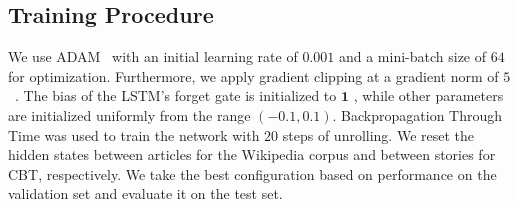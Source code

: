 \documentclass{article}
\newcommand{\vect}[1]{\ensuremath{\bm{#1}}}
\begin{document}
\subsection{Training Procedure}
We use ADAM~\citep{kingma2014adam} with an initial learning rate of $0.001$ and a mini-batch size of $64$ for optimization. 
Furthermore, we apply gradient clipping at a gradient norm of $5$~\citep{pascanu2013difficulty}.
The bias of the LSTM's forget gate is initialized to $\vect{1}$ \citep{JOZ16}, while other parameters are initialized uniformly from the range $(-0.1, 0.1)$.
Backpropagation Through Time \citep{rumelhart1985learning, werbos1990backpropagation} was used to train the network with $20$ steps of unrolling.
We reset the hidden states between articles for the Wikipedia corpus and between stories for CBT, respectively.
We take the best configuration based on performance on the validation set and evaluate it on the test set.
\end{document}
